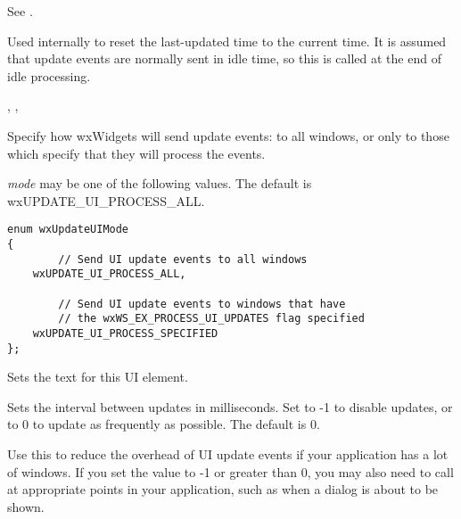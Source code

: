 See .

\label{wxupdateuieventresetupdatetime}


Used internally to reset the last-updated time to the
current time. It is assumed that update events are
normally sent in idle time, so this is called at the end of
idle processing.


, 
, 

\label{wxupdateuieventsetmode}


Specify how wxWidgets will send update events: to
all windows, or only to those which specify that they
will process the events.

{\it mode} may be one of the following values.
The default is wxUPDATE\_UI\_PROCESS\_ALL.

\begin{verbatim}
enum wxUpdateUIMode
{
        // Send UI update events to all windows
    wxUPDATE_UI_PROCESS_ALL,

        // Send UI update events to windows that have
        // the wxWS_EX_PROCESS_UI_UPDATES flag specified
    wxUPDATE_UI_PROCESS_SPECIFIED
};
\end{verbatim}

\label{wxupdateuieventsettext}


Sets the text for this UI element.

\label{wxupdateuieventsetupdateinterval}


Sets the interval between updates in milliseconds.
Set to -1 to disable updates, or to 0 to update as frequently as possible.
The default is 0.

Use this to reduce the overhead of UI update events if your application
has a lot of windows. If you set the value to -1 or greater than 0,
you may also need to call  
at appropriate points in your application, such as when a dialog
is about to be shown.

